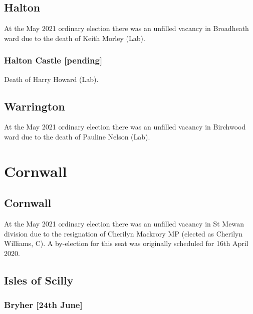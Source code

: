 \documentclass[a4paper,openany]{book}
\begin{document}
\begin{resultsiii}
\subsection*{Halton}

At the May 2021 ordinary election there was an unfilled vacancy in Broadheath ward due to the death of Keith Morley (Lab).

\subsubsection*{Halton Castle \hspace*{\fill}\nolinebreak[1]%
	\enspace\hspace*{\fill}
	[pending]}


Death of Harry Howard (Lab).

\subsection*{Warrington}

At the May 2021 ordinary election there was an unfilled vacancy in Birchwood ward due to the death of Pauline Nelson (Lab).

\section{Cornwall}

\subsection*{Cornwall}

At the May 2021 ordinary election there was an unfilled vacancy in St Mewan division due to the resignation of Cherilyn Mackrory MP (elected as Cherilyn Williams, C).  A by-election for this seat was originally scheduled for 16th April 2020.

\subsection*{Isles of Scilly}

\subsubsection*{Bryher \hspace*{\fill}\nolinebreak[1]%
	\enspace\hspace*{\fill}
	[24th June]}


\end{resultsiii}
\end{document}
